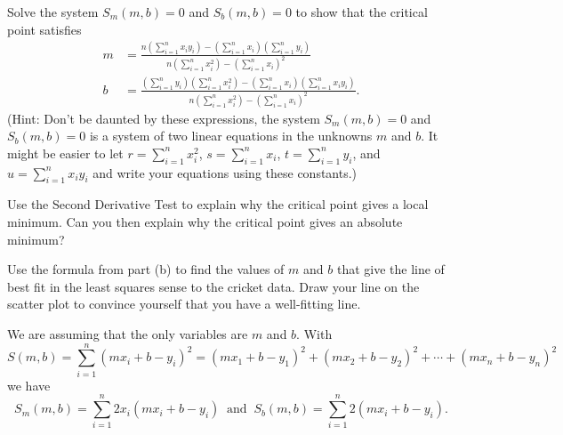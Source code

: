 \begin{exercises}
\item Solve the system $S_m(m,b) = 0$ and $S_b(m,b) = 0$ to show that the critical point satisfies 
\begin{align*}
m &= \frac{n\left(\sum_{i=1}^n x_iy_i\right) - \left(\sum_{i=1}^n x_i \right) \left(\sum_{i=1}^n y_i \right)}{n\left(\sum_{i=1}^n x_i^2 \right) - \left(\sum_{i=1}^n x_i \right)^2} \\
b &= \frac{\left(\sum_{i=1}^n y_i\right) \left(\sum_{i=1}^n x_i^2\right) - \left(\sum_{i=1}^n x_i \right) \left(\sum_{i=1}^n x_iy_i \right)}{n\left(\sum_{i=1}^n x_i^2 \right) - \left(\sum_{i=1}^n x_i \right)^2}.
\end{align*}
(Hint: Don't be daunted by these expressions, the system $S_m(m,b) = 0$ and $S_b(m,b) = 0$ is a system of two linear equations in the unknowns $m$ and $b$. It might be easier to let $r=\sum_{i=1}^n x_i^2$, $s=\sum_{i=1}^n x_i$, $t = \sum_{i=1}^n y_i$, and $u = \sum_{i=1}^n x_iy_i$ and write your equations using these constants.)

\item Use the Second Derivative Test to explain why the critical point gives a local minimum. Can you then explain why the critical point gives an absolute minimum? 

\item Use the formula from part (b) to find the values of $m$ and $b$ that give the line of best fit in the least squares sense to the cricket data. Draw your line on the scatter plot to convince yourself that you have a well-fitting line. 

\ea

\begin{exerciseSolution}
\ba
\item We are assuming that the only variables are $m$ and $b$. With 
\[S(m,b) = \sum_{i=1}^n (mx_i+b-y_i)^2 = (mx_1+b-y_1)^2 + (mx_2+b-y_2)^2 + \cdots + (mx_n+b-y_n)^2\]
we have 
\[S_m(m,b) =  \sum_{i=1}^n 2x_i(mx_i+b-y_i) \ \text{ and } \ S_b(m,b) = \sum_{i=1}^n 2(mx_i+b-y_i).\]


\end{exerciseSolution}
\end{exercises}
